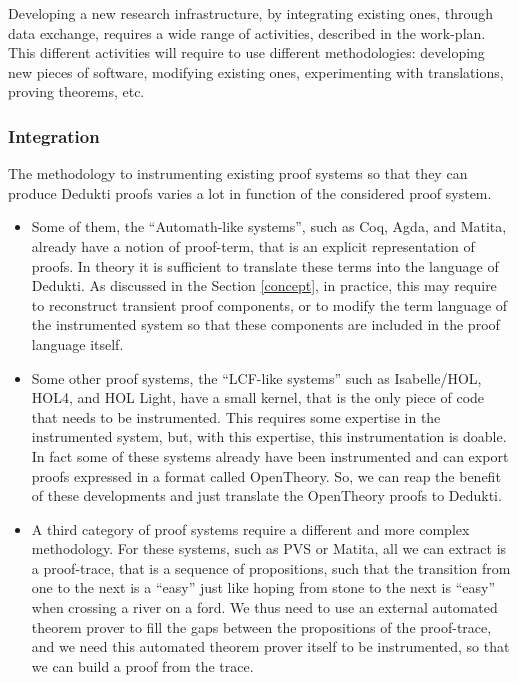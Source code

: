 Developing a new research infrastructure, by integrating existing
ones, through data exchange, requires a wide range of activities,
described in the work-plan. This different activities will require
to use different methodologies: developing new pieces of software,
modifying existing ones, experimenting with translations, proving
theorems, etc.

\subsubsection*{Integration}

The methodology to instrumenting existing proof systems so that they
can produce Dedukti proofs varies a lot in function of the considered
proof system.

\begin{itemize}

\item 
Some of them, the ``Automath-like systems'', such as Coq, Agda, and
Matita, already have a notion of proof-term, that is an explicit
representation of proofs.  In theory it is sufficient to translate
these terms into the language of Dedukti.  As discussed in the Section
\ref{concept}, in practice, this may require to reconstruct transient
proof components, or to modify the term language of the instrumented
system so that these components are included in the proof language
itself.

\item
Some other proof systems, the ``LCF-like systems'' such as
Isabelle/HOL, HOL4, and HOL Light, have a small kernel, that is the
only piece of code that needs to be instrumented. This requires some
expertise in the instrumented system, but, with this expertise, this
instrumentation is doable. In fact some of these systems already have
been instrumented and can export proofs expressed in a format called
OpenTheory. So, we can reap the benefit of these developments and just
translate the OpenTheory proofs to Dedukti.

\item
A third category of proof systems require a different and more complex
methodology. For these systems, such as PVS or Matita, all we can
extract is a proof-trace, that is a sequence of propositions, such
that the transition from one to the next is a ``easy'' just like
hoping from stone to the next is ``easy'' when crossing a river on a
ford. We thus need to use an external automated theorem prover to fill
the gaps between the propositions of the proof-trace, and we need this
automated theorem prover itself to be instrumented, so that we can
build a proof from the trace.
\end{itemize}

